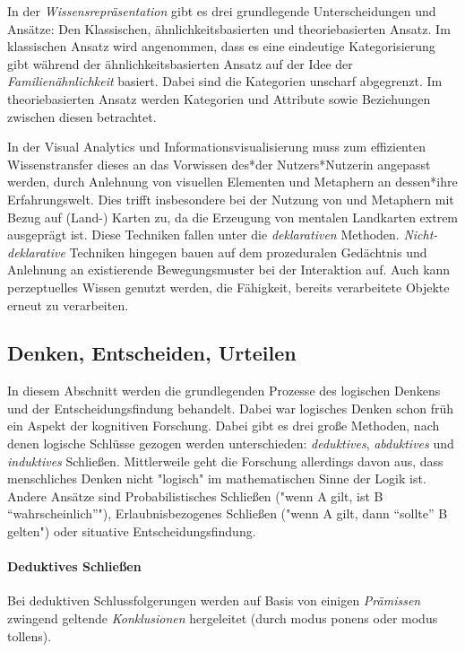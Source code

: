 	In der \emph{Wissensrepräsentation} gibt es drei grundlegende Unterscheidungen und Ansätze: Den Klassischen, ähnlichkeitsbasierten und theoriebasierten Ansatz. Im klassischen Ansatz wird angenommen, dass es eine eindeutige Kategorisierung gibt während der ähnlichkeitsbasierten Ansatz auf der Idee der \emph{Familienähnlichkeit} basiert. Dabei sind die Kategorien unscharf abgegrenzt. Im theoriebasierten Ansatz werden Kategorien und Attribute sowie Beziehungen zwischen diesen betrachtet.

	In der Visual Analytics und Informationsvisualisierung muss zum effizienten Wissenstransfer dieses an das Vorwissen des*der Nutzers*Nutzerin angepasst werden, \bspw durch Anlehnung von visuellen Elementen und Metaphern an dessen*ihre Erfahrungswelt. Dies trifft insbesondere bei der Nutzung von und Metaphern mit Bezug auf (Land-) Karten zu, da die Erzeugung von mentalen Landkarten extrem ausgeprägt ist. Diese Techniken fallen unter die \emph{deklarativen} Methoden. \emph{Nicht-deklarative} Techniken hingegen bauen auf dem prozeduralen Gedächtnis und Anlehnung an existierende Bewegungsmuster bei der Interaktion auf. Auch kann perzeptuelles Wissen genutzt werden, \dh die Fähigkeit, bereits verarbeitete Objekte erneut zu verarbeiten.

\subsection{Denken, Entscheiden, Urteilen}
In diesem Abschnitt werden die grundlegenden Prozesse des logischen Denkens und der Entscheidungsfindung behandelt. Dabei war logisches Denken schon früh ein Aspekt der kognitiven Forschung. Dabei gibt es drei große Methoden, nach denen logische Schlüsse gezogen werden unterschieden: \emph{deduktives}, \emph{abduktives} und \emph{induktives} Schließen. Mittlerweile geht die Forschung allerdings davon aus, dass menschliches Denken nicht "logisch" im mathematischen Sinne der Logik ist. Andere Ansätze sind \zB Probabilistisches Schließen ("wenn A gilt, ist B \enquote{wahrscheinlich}"), Erlaubnisbezogenes Schließen ("wenn A gilt, dann \enquote{sollte} B gelten") oder situative Entscheidungsfindung.

\paragraph{Deduktives Schließen}
Bei deduktiven Schlussfolgerungen werden auf Basis von einigen \emph{Prämissen} zwingend geltende \emph{Konklusionen} hergeleitet (\bspw durch modus ponens oder modus tollens).

